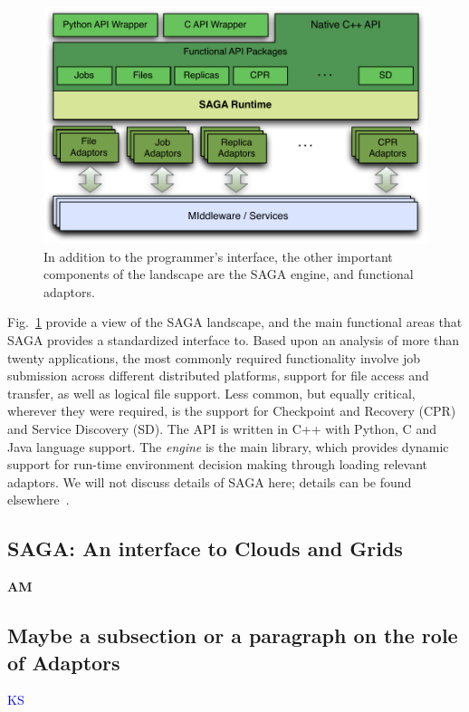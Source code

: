 \documentclass[conference,final]{IEEEtran}
\begin{document}
\begin{figure}[t]
\vspace{-2em}
\includegraphics[scale=0.5]{saga-figure02.pdf}
\caption{In addition to the programmer's interface,
  the other important components of the landscape are the SAGA engine,
  and functional adaptors.} \vspace{-2em}
\label{saga_figure}
\end{figure}

Fig.~\ref{saga_figure} provide a view of the SAGA landscape, and the
main functional areas that SAGA provides a standardized interface
to. Based upon an analysis of more than twenty applications, the most
commonly required functionality involve job submission across
different distributed platforms, support for file access and transfer,
as well as logical file support. Less common, but equally critical,
wherever they were required, is the support for Checkpoint and
Recovery (CPR) and Service Discovery (SD).  The API is written in C++
with Python, C and Java language support. The {\it engine} is the main
library, which provides dynamic support for run-time environment
decision making through loading relevant adaptors. We will not discuss
details of SAGA here; details can be found elsewhere~\cite{saga_url}.

\subsection{SAGA: An interface to Clouds and Grids}{\bf AM}

\subsection{Maybe  a subsection or a paragraph on the role of Adaptors} {\textcolor{blue} {KS}}
\end{document}
